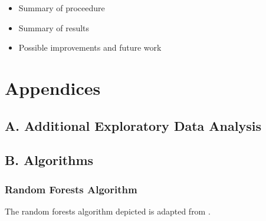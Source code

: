 \documentclass[12pt,]{article}
\providecommand{\tightlist}{%
  \setlength{\itemsep}{0pt}\setlength{\parskip}{0pt}}
\newcommand{\appendixA}{ \setcounter{table}{0} \renewcommand{\thetable}{A\arabic{table}} \setcounter{figure}{0} \renewcommand{\thefigure}{A\arabic{figure}} }
\newcommand{\appendixB}{ \setcounter{table}{0} \renewcommand{\thetable}{B\arabic{table}} \setcounter{figure}{0} \renewcommand{\thefigure}{B\arabic{figure}} }
\begin{document}
\begin{itemize}
\tightlist
\item
  Summary of proceedure
\item
  Summary of results
\item
  Possible improvements and future work
\end{itemize}

\newpage

\section*{Appendices}\label{appendices}

\subsection*{A. Additional Exploratory Data
Analysis}\label{a.-additional-exploratory-data-analysis}

\appendixA

\subsection*{B. Algorithms}\label{b.-algorithms}

\appendixB

\subsubsection{Random Forests Algorithm}\label{random-forests-algorithm}

The random forests algorithm depicted is adapted from
\autocite{hastie_elements_2009}.
\end{document}
